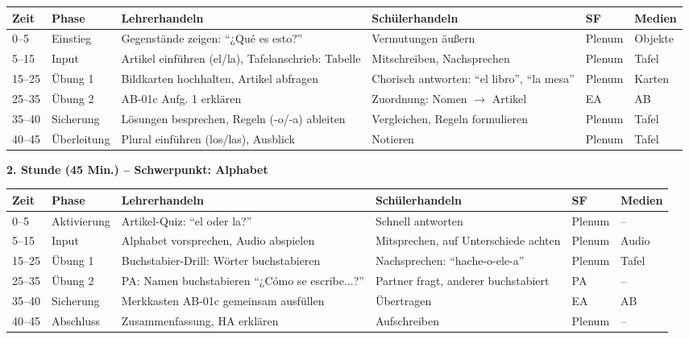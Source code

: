 \documentclass[11pt,a4paper]{article}
\begin{document}
\begin{longtable}{|p{1cm}|p{1.5cm}|p{4cm}|p{3cm}|p{2cm}|p{2cm}|}
\hline
\textbf{Zeit} & \textbf{Phase} & \textbf{Lehrerhandeln} & \textbf{Schülerhandeln} & \textbf{SF} & \textbf{Medien} \\
\hline
\endhead

0--5 & Einstieg & Gegenstände zeigen: ``¿Qué es esto?'' & Vermutungen äußern & Plenum & Objekte \\
\hline

5--15 & Input & Artikel einführen (el/la), Tafelanschrieb: Tabelle & Mitschreiben, Nachsprechen & Plenum & Tafel \\
\hline

15--25 & Übung 1 & Bildkarten hochhalten, Artikel abfragen & Chorisch antworten: ``el libro'', ``la mesa'' & Plenum & Karten \\
\hline

25--35 & Übung 2 & AB-01c Aufg. 1 erklären & Zuordnung: Nomen $\rightarrow$ Artikel & EA & AB \\
\hline

35--40 & Sicherung & Lösungen besprechen, Regeln (-o/-a) ableiten & Vergleichen, Regeln formulieren & Plenum & Tafel \\
\hline

40--45 & Über\-leitung & Plural einführen (los/las), Ausblick & Notieren & Plenum & Tafel \\
\hline
\end{longtable}

\vspace{1em}

\textbf{2. Stunde (45 Min.) -- Schwerpunkt: Alphabet}

\begin{longtable}{|p{1cm}|p{1.5cm}|p{4cm}|p{3cm}|p{2cm}|p{2cm}|}
\hline
\textbf{Zeit} & \textbf{Phase} & \textbf{Lehrerhandeln} & \textbf{Schülerhandeln} & \textbf{SF} & \textbf{Medien} \\
\hline
\endhead

0--5 & Aktivierung & Artikel-Quiz: ``el oder la?'' & Schnell antworten & Plenum & -- \\
\hline

5--15 & Input & Alphabet vorsprechen, Audio abspielen & Mitsprechen, auf Unterschiede achten & Plenum & Audio \\
\hline

15--25 & Übung 1 & Buchstabier-Drill: Wörter buchstabieren & Nachsprechen: ``hache-o-ele-a'' & Plenum & Tafel \\
\hline

25--35 & Übung 2 & PA: Namen buchstabieren ``¿Cómo se escribe...?'' & Partner fragt, anderer buchstabiert & PA & -- \\
\hline

35--40 & Sicherung & Merkkasten AB-01c gemeinsam ausfüllen & Übertragen & EA & AB \\
\hline

40--45 & Abschluss & Zusammenfassung, HA erklären & Aufschreiben & Plenum & -- \\
\hline
\end{longtable}
\end{document}
